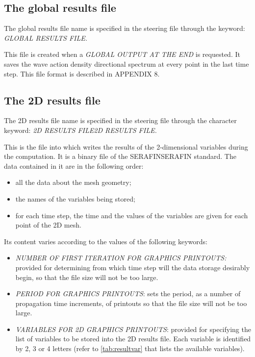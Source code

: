 \subsection{ The global results file}

 The global results file name is specified in the steering file through the keyword: \textit{GLOBAL RESULTS FILE.}

 This file is created when a \textit{GLOBAL OUTPUT AT THE END} is requested. It saves the wave action density directional spectrum at every point in the last time step. This file format is described in APPENDIX 8.


\subsection{ The 2D results file }

 The 2D results file name is specified in the steering file through the character keyword: \textit{2D RESULTS FILE2D RESULTS FILE.}

 This is the file into which \tomawac writes the results of the 2-dimensional variables during the computation. It is a binary file of the SERAFINSERAFIN standard. The data contained in it are in the following order:

\begin{itemize}
\item  all the data about the mesh geometry;

\item  the names of the variables being stored;

\item  for each time step, the time and the values of the variables are given for each point of the 2D mesh.
\end{itemize}

 Its content varies according to the values of the following keywords:

\begin{itemize}
\item  \textit{NUMBER OF FIRST ITERATION FOR GRAPHICS PRINTOUTS:} provided for determining from which time step will the data storage desirably begin, so that the file size will not be too large.

\item  \textit{PERIOD FOR GRAPHICS PRINTOUTS}: sets the period, as a number of propagation time increments, of printouts so that the file size will not be too large.

\item  \textit{VARIABLES FOR 2D GRAPHICS PRINTOUTS}: provided for specifying the list of variables to be stored into the 2D results file. Each variable is identified by 2, 3 or 4 letters (refer to \ref{tab:resultvar} that lists the available variables).
\end{itemize}



